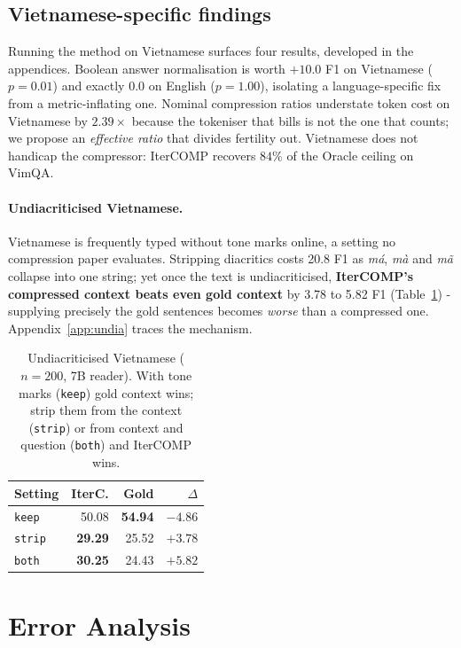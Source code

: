 \documentclass[11pt]{article}
\begin{document}
\subsection{Vietnamese-specific findings}
\label{sec:vnfindings}
Running the method on Vietnamese surfaces four results, developed in the
appendices. Boolean answer normalisation is worth $+10.0$ F1 on
Vietnamese ($p=0.01$) and exactly $0.0$ on English ($p=1.00$), isolating a
language-specific fix from a metric-inflating one. Nominal compression
ratios understate token cost on Vietnamese by $2.39\times$ because the tokeniser
that bills is not the one that counts; we propose an \emph{effective ratio} that
divides fertility out. Vietnamese does not handicap the compressor:
IterCOMP recovers $84\%$ of the Oracle ceiling on VimQA.

\paragraph{Undiacriticised Vietnamese.} Vietnamese is frequently typed without
tone marks online, a setting no compression paper evaluates. Stripping diacritics
costs 20.8 F1 as \emph{má}, \emph{mà} and \emph{mã} collapse into one string; yet
once the text is undiacriticised, \textbf{IterCOMP's compressed context beats even
gold context} by 3.78 to 5.82 F1 (Table~\ref{tab:undia}) - supplying precisely
the gold sentences becomes \emph{worse} than a compressed one.
Appendix~\ref{app:undia} traces the mechanism.

\begin{table}[htbp]
\centering
\small
\begin{tabular}{lrrr}
\toprule
Setting & IterC. & Gold & $\Delta$ \\
\midrule
\texttt{keep}  & 50.08 & \textbf{54.94} & $-4.86$ \\
\texttt{strip} & \textbf{29.29} & 25.52 & $+3.78$ \\
\texttt{both}  & \textbf{30.25} & 24.43 & $+5.82$ \\
\bottomrule
\end{tabular}
\caption{Undiacriticised Vietnamese ($n=200$, 7B reader). With tone marks
(\texttt{keep}) gold context wins; strip them from the context (\texttt{strip})
or from context and question (\texttt{both}) and IterCOMP wins.}
\label{tab:undia}
\end{table}

\section{Error Analysis}
\label{sec:vietnamese}
\label{sec:erroranalysis}
\label{app:errors}
\end{document}
